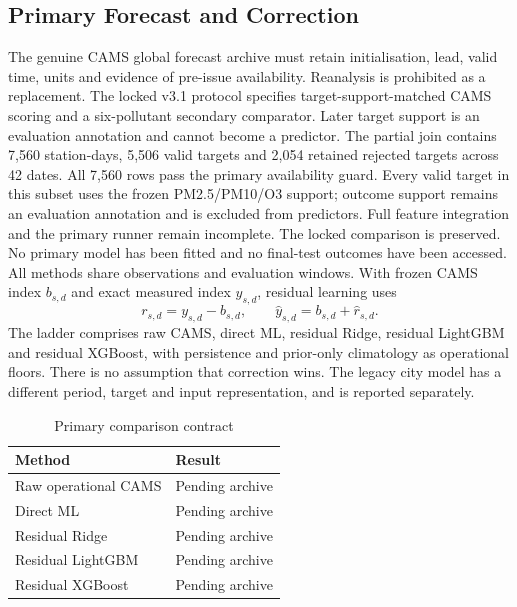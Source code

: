 \subsection{Primary Forecast and Correction}
The genuine CAMS global forecast archive \cite{cams2024forecasts} must retain
initialisation, lead, valid time, units and evidence of pre-issue availability.
Reanalysis is prohibited as a replacement. The locked v3.1 protocol specifies
target-support-matched CAMS scoring and a six-pollutant secondary comparator.
Later target support is an evaluation annotation and cannot become a predictor.
The partial join contains 7,560 station-days, 5,506 valid targets and 2,054 retained rejected targets across 42 dates. All 7,560 rows pass the primary availability guard. Every valid target in this subset uses the frozen PM2.5/PM10/O3 support; outcome support remains an evaluation annotation and is excluded from predictors. Full feature integration and the primary runner remain incomplete. The locked comparison is preserved. No primary model has been fitted and no final-test outcomes have been accessed.
All methods share observations and evaluation windows. With frozen CAMS index
$b_{s,d}$ and exact measured index $y_{s,d}$, residual learning uses
\begin{equation}r_{s,d}=y_{s,d}-b_{s,d},\qquad
\widehat y_{s,d}=b_{s,d}+\widehat r_{s,d}.\end{equation}
The ladder comprises raw CAMS, direct ML, residual Ridge, residual LightGBM and
residual XGBoost, with persistence and prior-only climatology as operational
floors. There is no assumption that correction wins. The legacy city model has
a different period, target and input representation, and is reported separately.

\begin{table}[h]\centering\caption{Primary comparison contract}
\begin{tabular}{ll}\toprule Method & Result \\\midrule
Raw operational CAMS & Pending archive \\
Direct ML & Pending archive \\
Residual Ridge & Pending archive \\
Residual LightGBM & Pending archive \\
Residual XGBoost & Pending archive \\\bottomrule\end{tabular}\end{table}






